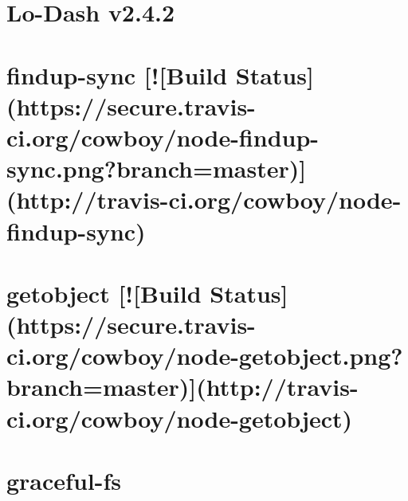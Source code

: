 \documentclass[twoside]{book}
\newcommand{\+}{\discretionary{\mbox{\scriptsize$\hookleftarrow$}}{}{}}
\begin{document}
\chapter{Lo-\/\+Dash v2.4.2}
\label{md__c_1__users_martin__documents__git_hub_visual_studio__bachelor__wis_r__wis_r_node_modules_gru6b2e838130bad895d52148bfff1c19de}
\hypertarget{md__c_1__users_martin__documents__git_hub_visual_studio__bachelor__wis_r__wis_r_node_modules_gru6b2e838130bad895d52148bfff1c19de}{}

\chapter{findup-\/sync \mbox{[}!\mbox{[}Build Status\mbox{]}(https\+://secure.travis-\/ci.org/cowboy/node-\/findup-\/sync.png?branch=master)\mbox{]}(http\+://travis-\/ci.org/cowboy/node-\/findup-\/sync)}
\label{md__c_1__users_martin__documents__git_hub_visual_studio__bachelor__wis_r__wis_r_node_modules_gru376a0d488e63d0a0458d9551d8531b7e}
\hypertarget{md__c_1__users_martin__documents__git_hub_visual_studio__bachelor__wis_r__wis_r_node_modules_gru376a0d488e63d0a0458d9551d8531b7e}{}

\chapter{getobject \mbox{[}!\mbox{[}Build Status\mbox{]}(https\+://secure.travis-\/ci.org/cowboy/node-\/getobject.png?branch=master)\mbox{]}(http\+://travis-\/ci.org/cowboy/node-\/getobject)}
\label{md__c_1__users_martin__documents__git_hub_visual_studio__bachelor__wis_r__wis_r_node_modules_gruc3dbe4415798e9272188fda976c4d19a}
\hypertarget{md__c_1__users_martin__documents__git_hub_visual_studio__bachelor__wis_r__wis_r_node_modules_gruc3dbe4415798e9272188fda976c4d19a}{}

\chapter{graceful-\/fs}
\label{md__c_1__users_martin__documents__git_hub_visual_studio__bachelor__wis_r__wis_r_node_modules_gru9180f83ce106c5838ac138cda869bac0}
\hypertarget{md__c_1__users_martin__documents__git_hub_visual_studio__bachelor__wis_r__wis_r_node_modules_gru9180f83ce106c5838ac138cda869bac0}{}

\end{document}
